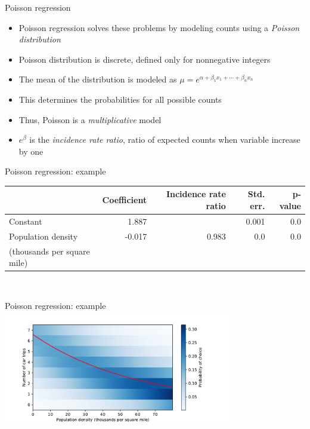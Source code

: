 \begin{frame}{Poisson regression}
  \begin{itemize}
    \item Poisson regression solves these problems by modeling counts using a \emph{Poisson distribution}
    \item Poisson distribution is discrete, defined only for nonnegative integers
    \item The mean of the distribution is modeled as $\mu = e^{\alpha + \beta_1 x_1 + \cdots + \beta_n x_n}$
    \item This determines the probabilities for all possible counts
    \item Thus, Poisson is a \emph{multiplicative} model
    \item $e^\beta$ is the \emph{incidence rate ratio}, ratio of expected counts when variable increase by one
  \end{itemize}
\end{frame}

\begin{frame}{Poisson regression: example}
  \centering\begin{tabular}{lrrrr}
  \toprule
  {} &  Coefficient &  Incidence rate ratio &  Std. err. &  p-value \\
  \midrule
  Constant    &     1.887 &              &   0.001 &      0.0 \\
  Population density &    -0.017 &              0.983 &   0.0 &      0.0 \\
  (thousands per square mile) & & & & \\
  \bottomrule
  \end{tabular}\\
  \tiny\citenhts
\end{frame}

\begin{frame}[label=pois]{Poisson regression: example}
  \centering\includegraphics[width=0.75\textwidth]{fig/poisson.pdf}\\
  \tiny\citenhts
\end{frame}

